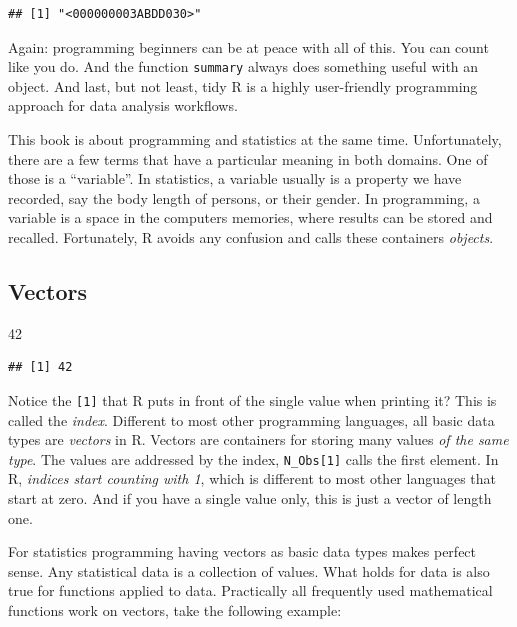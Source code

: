 \documentclass[]{svmono}
\newenvironment{Shaded}{\begin{snugshade}}{\end{snugshade}}
\newcommand{\DecValTok}[1]{\textcolor[rgb]{0.00,0.00,0.81}{#1}}
\begin{document}
\begin{verbatim}
## [1] "<000000003ABDD030>"
\end{verbatim}

Again: programming beginners can be at peace with all of this. You can
count like you do. And the function \texttt{summary} always does
something useful with an object. And last, but not least, tidy R is a
highly user-friendly programming approach for data analysis workflows.

This book is about programming and statistics at the same time.
Unfortunately, there are a few terms that have a particular meaning in
both domains. One of those is a ``variable''. In statistics, a variable
usually is a property we have recorded, say the body length of persons,
or their gender. In programming, a variable is a space in the computers
memories, where results can be stored and recalled. Fortunately, R
avoids any confusion and calls these containers \emph{objects}.

\subsection{Vectors}\label{vectors}

\begin{Shaded}
\begin{Highlighting}[]
\DecValTok{42}
\end{Highlighting}
\end{Shaded}

\begin{verbatim}
## [1] 42
\end{verbatim}

Notice the \texttt{{[}1{]}} that R puts in front of the single value
when printing it? This is called the \emph{index}. Different to most
other programming languages, all basic data types are \emph{vectors} in
R. Vectors are containers for storing many values \emph{of the same
type}. The values are addressed by the index, \texttt{N\_Obs{[}1{]}}
calls the first element. In R, \emph{indices start counting with 1},
which is different to most other languages that start at zero. And if
you have a single value only, this is just a vector of length one.

For statistics programming having vectors as basic data types makes
perfect sense. Any statistical data is a collection of values. What
holds for data is also true for functions applied to data. Practically
all frequently used mathematical functions work on vectors, take the
following example:
\end{document}
